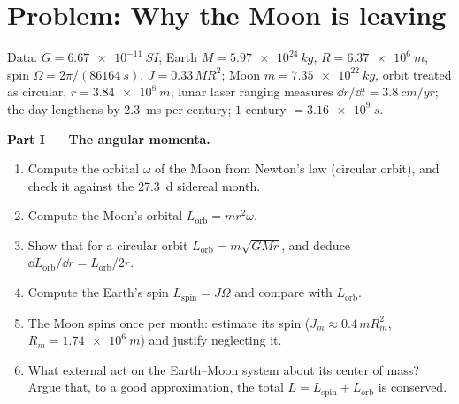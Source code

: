 \section{Problem: Why the Moon is leaving}

\begin{problem}
\label{pb:b1:angular-momentum:1}
Data: $G = \qty{6.67e-11}{SI}$; Earth $M = \qty{5.97e24}{kg}$, $R =
\qty{6.37e6}{m}$, spin $\Omega = 2\pi/(\qty{86164}{s})$, 
$J = 0.33\,MR^2$; Moon $m = \qty{7.35e22}{kg}$, orbit treated as
circular, $r = \qty{3.84e8}{m}$; lunar laser ranging measures
$\dd r/\dd t = \qty{3.8}{cm/yr}$; the day lengthens by \qty{2.3}{ms} per
century; $1$ century $= \qty{3.16e9}{s}$.

\medskip
\noindent\textbf{Part I --- The angular momenta.}
\begin{enumerate}
  \item Compute the orbital  $\omega$ of the Moon from
        Newton's law (circular orbit), and check it against the
        \qty{27.3}{d} sidereal month.
  \item Compute the Moon's orbital  $L_{\text{orb}} =
        mr^2\omega$.
  \item Show that for a circular orbit $L_{\text{orb}} = m\sqrt{GMr}$, and
        deduce $\dd L_{\text{orb}}/\dd r = L_{\text{orb}}/2r$.
  \item Compute the Earth's spin  $L_{\text{spin}} =
        J\Omega$ and compare with $L_{\text{orb}}$.
  \item The Moon spins once per month: estimate its spin  ($J_m \approx 0.4\,mR_m^2$, $R_m = \qty{1.74e6}{m}$) and
        justify neglecting it.
  \item What external  act on the Earth--Moon system about its
        center of mass? Argue that, to a good approximation, the total
        $L = L_{\text{spin}} + L_{\text{orb}}$ is conserved.
\end{enumerate}


\end{problem}
